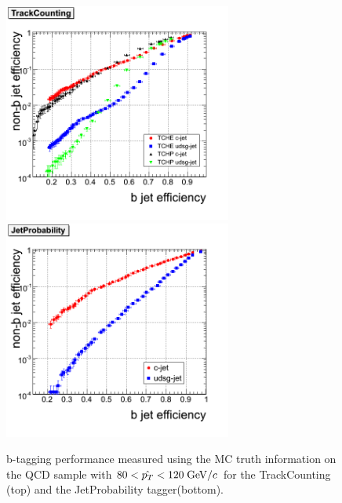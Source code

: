 \begin{figure}[htbp]
  \begin{center}
    \includegraphics[width=75mm]{Figures/Performance_plot_TC.png}
    \includegraphics[width=75mm]{Figures/Performance_plot_TP.png}
  \end{center}
  \caption{b-tagging performance measured using the MC truth information 
on the QCD sample with $80<\hat{p_T}<120\;{\rm GeV}/c$ for the TrackCounting 
(top) and the JetProbability tagger(bottom).}
  \label{fig:Performance_plots}
\end{figure}

